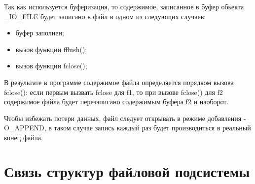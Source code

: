 Так как используется буферизация, то содержимое, записанное в буфер обьекта \_IO\_FILE будет записано в файл в одном из следующих случаев:
\begin{itemize}[topsep=0pt, partopsep=0pt, itemsep=0pt, parsep=0pt]
	\item буфер заполнен;
	\item вызов функции fflush();
	\item  вызов функции fclose(); 
\end{itemize}

В результате в программе содержимое файла определяется порядком вызова fclose(): если первым вызвать fclose для f1, то при вызове fclose() для f2 содержимое файла будет перезаписано содержимым буфера f2 и наоборот.

Чтобы избежать потери данных, файл следует открывать в режиме добавления - O\_APPEND, в таком случае запись каждый раз будет производиться в реальный конец файла.

\section{Связь структур файловой подсистемы}
\FloatBarrier
{}
\FloatBarrier